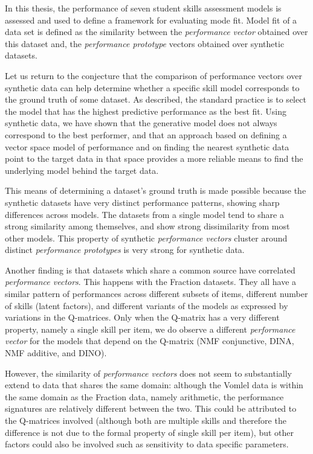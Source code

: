 \label{sec:Conclusion}

In this thesis, the performance of seven student skills assessment models is assessed and used to define a framework for evaluating mode fit. Model fit of a data set is defined as the similarity between the \textit{performance vector} obtained over this dataset and, the \textit{performance prototype} vectors obtained over synthetic datasets.

Let us return to the conjecture that the comparison of performance vectors over synthetic data can help determine whether a specific skill model corresponds to the ground truth of some dataset. As described, the standard practice is to select the model that has the highest predictive performance as the best fit. Using synthetic data, we have shown that the generative model does not always correspond to the best performer, and that an approach based on defining a vector space model of performance and on finding the nearest synthetic data point to the target data in that space provides a more reliable means to find the underlying model behind the target data.

This means of determining a dataset's ground truth is made possible because the synthetic datasets have very distinct performance patterns, showing sharp differences across models. The datasets from a single model tend to share a strong similarity among themselves, and show strong dissimilarity from most other models. This property of synthetic \textit{performance vectors} cluster around distinct \textit{performance prototypes} is very strong for synthetic data.

Another finding is that datasets which share a common source have correlated \textit{performance vectors}. This happens with the Fraction datasets. They all have a similar pattern of performances across different subsets of items, different number of skills (latent factors), and different variants of the models as expressed by variations in the Q-matrices. Only when the Q-matrix has a very different property, namely a single skill per item, we do observe a different \textit{performance vector} for the models that depend on the Q-matrix (NMF conjunctive, DINA, NMF additive, and DINO). 

However, the similarity of \textit{performance vectors} does not seem to substantially extend to data that shares the same domain: although the Vomlel data is within the same domain as the Fraction data, namely arithmetic, the performance signatures are relatively different between the two. This could be attributed to the Q-matrices involved (although both are multiple skills and therefore the difference is not due to the formal property of single skill per item), but other factors could also be involved such as sensitivity to data specific parameters.

